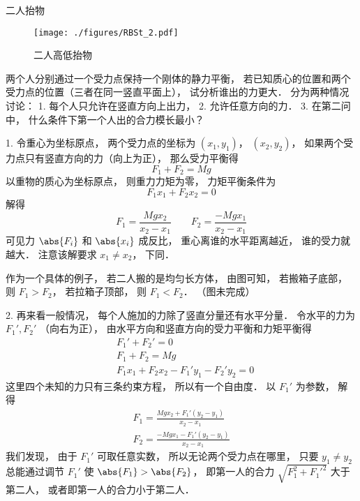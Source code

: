\begin{example}{二人抬物}
\begin{figure}[ht]
\centering
\texttt{[image: ./figures/RBSt\_2.pdf]}
\caption{二人高低抬物} \label{RBSt_fig2}
\end{figure}
两个人分别通过一个受力点保持一个刚体的静力平衡， 若已知质心的位置和两个受力点的位置（三者在同一竖直平面上）， 试分析谁出的力更大． 分为两种情况讨论： 1. 每个人只允许在竖直方向上出力， 2. 允许任意方向的力． 3. 在第二问中， 什么条件下第一个人出的合力模长最小？

1. 令重心为坐标原点， 两个受力点的坐标为 $(x_1, y_1)$， $(x_2, y_2)$， 如果两个受力点只有竖直方向的力（向上为正）， 那么受力平衡得
\begin{equation}
F_1 + F_2 = Mg
\end{equation}
以重物的质心为坐标原点， 则重力力矩为零， 力矩平衡条件为
\begin{equation}
F_1 x_1 + F_2 x_2 = 0
\end{equation}
解得
\begin{equation}
F_1 = \frac{Mg x_2}{x_2 - x_1} \qquad F_2 = \frac{-Mg x_1}{x_2 - x_1}
\end{equation}
可见力 $\abs{F_i}$ 和 $\abs{x_i}$ 成反比， 重心离谁的水平距离越近， 谁的受力就越大． 注意该解要求 $x_1 \ne x_2$， 下同．

作为一个具体的例子， 若二人搬的是均匀长方体， 由图可知， 若搬箱子底部， 则 $F_1 > F_2$， 若拉箱子顶部， 则 $F_1 < F_2$． （图未完成）

2. 再来看一般情况， 每个人施加的力除了竖直分量还有水平分量． 令水平的力为 $F_1', F_2'$ （向右为正）， 由水平方向和竖直方向的受力平衡和力矩平衡得
\begin{equation}
\begin{aligned}
&F_1' + F_2' = 0\\
&F_1 + F_2 = Mg\\
&F_1 x_1 + F_2 x_2 - F_1' y_1 - F_2' y_2 = 0
\end{aligned}
\end{equation}
这里四个未知的力只有三条约束方程， 所以有一个自由度． 以 $F_1'$ 为参数， 解得
\begin{equation}\label{RBSt_eq1}
\begin{aligned}
F_1 = \frac{Mg x_2 + F_1'(y_2 - y_1)}{x_2 - x_1}\\
F_2 = \frac{-Mg x_1 - F_1'(y_2 - y_1)}{x_2 - x_1}
\end{aligned}
\end{equation}
我们发现， 由于 $F_1'$ 可取任意实数， 所以无论两个受力点在哪里， 只要 $y_1 \ne y_2$ 总能通过调节 $F_1'$ 使 $\abs{F_1} > \abs{F_2}$， 即第一人的合力 $\sqrt{F_1^2 + F_1'^2}$ 大于第二人， 或者即第一人的合力小于第二人．


\end{example}
